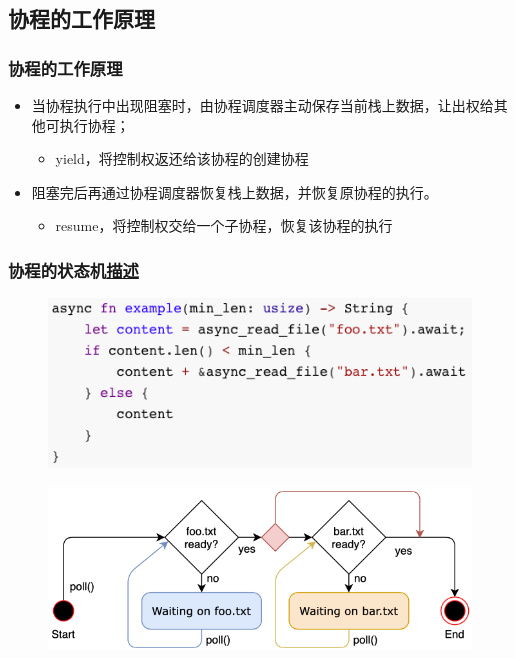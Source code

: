 \subsection{协程的工作原理}
% 
\begin{frame}[fragile]
    \frametitle{协程的工作原理}
% 
    \begin{itemize}
        \item 当协程执行中出现阻塞时，由协程调度器主动保存当前栈上数据，让出权给其他可执行协程； \pause
    \begin{itemize}
        \item yield，将控制权返还给该协程的创建协程
    \end{itemize}
        \item 阻塞完后再通过协程调度器恢复栈上数据，并恢复原协程的执行。 \pause
    \begin{itemize}
        \item resume，将控制权交给一个子协程，恢复该协程的执行
    \end{itemize}

% 
    \end{itemize}
\end{frame}
\begin{frame}[fragile]
    \frametitle{协程的状态机\href{https://os.phil-opp.com/async-await/\#the-async-await-pattern}{描述}}
% 
	\begin{figure}
		\centering
		\includegraphics[width=0.5\linewidth]{figs/Rust-fsm.png}
	\end{figure}

\pause
% 
	\begin{figure}
		\centering
		\includegraphics[width=0.6\linewidth]{figs/async-state-machine-basic.png}
    \end{figure}


% 
% 
% 

\end{frame}
